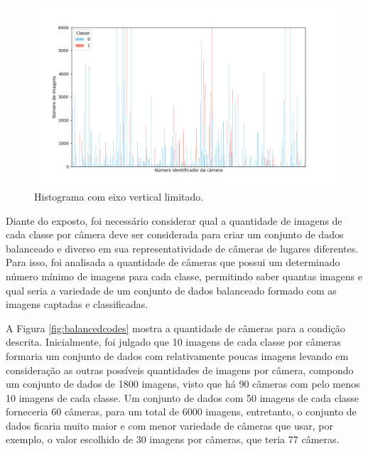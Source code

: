 \begin{figure}[htb]
\centerline{\includegraphics[width=1\linewidth]{images/totalcountzoom_code.png}}
\caption{Histograma com eixo vertical limitado.}
\label{fig:totalcountzoom}
\end{figure}


Diante do exposto, foi necessário considerar qual a quantidade de imagens de cada classe por câmera deve ser considerada para criar um conjunto de dados balanceado e diverso em sua representatividade de câmeras de lugares diferentes. 
Para isso, foi analisada a quantidade de câmeras que possui  um determinado número mínimo de imagens para cada classe, permitindo saber quantas imagens e qual seria a variedade de um conjunto de dados balanceado formado com as imagens captadas e classificadas.

A Figura \ref{fig:balancedcodes} mostra a quantidade de câmeras para a condição descrita. 
Inicialmente, foi julgado que 10 imagens de cada classe por câmeras formaria um conjunto de dados com relativamente poucas imagens levando em consideração as outras possíveis quantidades de imagens por câmera, compondo um conjunto de dados de 1800 imagens, visto que há 90 câmeras com pelo menos 10 imagens de cada classe. 
Um conjunto de dados com 50 imagens de cada classe forneceria 60 câmeras, para um total de 6000 imagens, entretanto, o conjunto de dados ficaria muito maior e com menor variedade de câmeras que usar, por exemplo, o valor escolhido de 30 imagens por câmeras, que teria 77 câmeras. 

